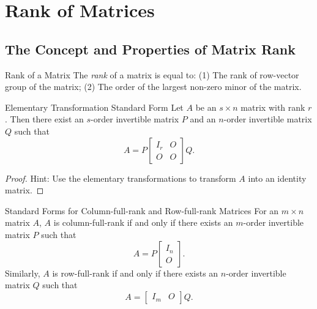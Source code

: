 
\section{Rank of Matrices}

\subsection{The Concept and Properties of Matrix Rank}

\begin{definition}{Rank of a Matrix}{}
  The \emph{rank} of a matrix is equal to:
  (1) The rank of row-vector group of the matrix;
  (2) The order of the largest non-zero minor of the matrix.
\end{definition}

\begin{proposition}{Elementary Transformation Standard Form}{}
  Let $A$ be an $s \times n$ matrix with rank $r$.
  Then there exist an $s$-order invertible matrix $P$
  and an $n$-order invertible matrix $Q$ such that
  \begin{equation}
    A = P \left[
      \begin{array}{cc}
        I_r & O\\
         O  & O
      \end{array}
    \right] Q.
  \end{equation}
\end{proposition}

\begin{proof}
  Hint: Use the elementary transformations to transform $A$ into an identity matrix.
\end{proof}

\begin{corollary}{Standard Forms for Column-full-rank and Row-full-rank Matrices}{}
  For an $m \times n$ matrix $A$,
  $A$ is column-full-rank if and only if there exists an $m$-order invertible
  matrix $P$ such that
  \begin{equation}
    A = P \left[
      \begin{array}{c}
        I_n\\
        O
      \end{array}
    \right].
  \end{equation}
  Similarly, $A$ is row-full-rank if and only if there exists an $n$-order invertible
  matrix $Q$ such that
  \begin{equation}
    A = \left[
      \begin{array}{cc}
        I_m&O
      \end{array}
    \right]Q.
  \end{equation}
\end{corollary}

